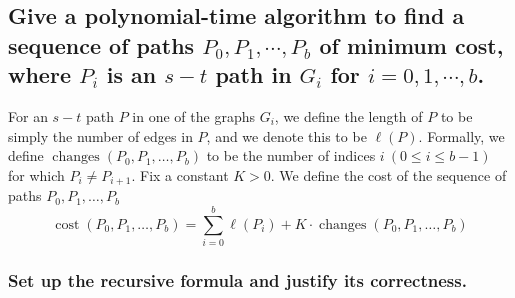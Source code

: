 \documentclass[11pt]{scrartcl}
\begin{document}
\subsection{
	Give a polynomial-time algorithm to find a sequence of paths
	$P_0, P_1, \cdots , P_b$ of minimum cost, where $P_i$ is an $s-t$ path in $G_i$ for
	$i = 0, 1, \cdots, b$.
}
For an $s-t$ path $P$ in one
of the graphs $G_i$, we define the length of $P$ to be simply the number of
edges in $P$, and we denote this to be $\ell(P)$.
Formally, we
define $\operatorname{changes}(P_{0}, P_{1}, \ldots, P_{b})$ to be the number of indices $i \ (0 \leq i \leq b - 1)$
for which $P_i \neq P_{i+1}$.
Fix a constant $K>0 .$ We define the cost of the sequence of paths
$P_{0}, P_{1}, \ldots, P_{b}$
\[
	\operatorname{cost}\left(P_{0}, P_{1}, \ldots, P_{b}\right)=
	\sum_{i=0}^{b} \ell\left(P_{i}\right)+K \cdot \operatorname{changes}\left(P_{0}, P_{1}, \ldots, P_{b}\right)
\]
\subsubsection{
	Set up the recursive formula and justify its correctness.
}
\end{document}
